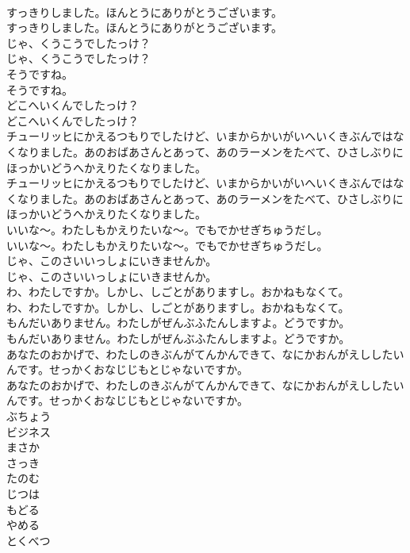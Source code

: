 \documentclass[8pt]{extreport}
\begin{document}
\begin{CJK}{UTF8}{min}
\\	すっきりしました。ほんとうにありがとうございます。	
\\	すっきりしました。ほんとうにありがとうございます。 
\\	じゃ、くうこうでしたっけ？	
\\	じゃ、くうこうでしたっけ？ 
\\	そうですね。	
\\	そうですね。 
\\	どこへいくんでしたっけ？	
\\	どこへいくんでしたっけ？ 
\\	チューリッヒにかえるつもりでしたけど、いまからかいがいへいくきぶんではなくなりました。あのおばあさんとあって、あのラーメンをたべて、ひさしぶりにほっかいどうへかえりたくなりました。	
\\	チューリッヒにかえるつもりでしたけど、いまからかいがいへいくきぶんではなくなりました。あのおばあさんとあって、あのラーメンをたべて、ひさしぶりにほっかいどうへかえりたくなりました。 
\\	いいな〜。わたしもかえりたいな〜。でもでかせぎちゅうだし。	
\\	いいな〜。わたしもかえりたいな〜。でもでかせぎちゅうだし。 
\\	じゃ、このさいいっしょにいきませんか。	
\\	じゃ、このさいいっしょにいきませんか。 
\\	わ、わたしですか。しかし、しごとがありますし。おかねもなくて。	
\\	わ、わたしですか。しかし、しごとがありますし。おかねもなくて。 
\\	もんだいありません。わたしがぜんぶふたんしますよ。どうですか。	
\\	もんだいありません。わたしがぜんぶふたんしますよ。どうですか。 
\\	あなたのおかげで、わたしのきぶんがてんかんできて、なにかおんがえししたいんです。せっかくおなじじもとじゃないですか。	
\\	あなたのおかげで、わたしのきぶんがてんかんできて、なにかおんがえししたいんです。せっかくおなじじもとじゃないですか。 
\\	ぶちょう
\\	ビジネス
\\	まさか
\\	さっき
\\	たのむ
\\	じつは
\\	もどる
\\	やめる
\\	とくべつ

\end{CJK}
\end{document}
